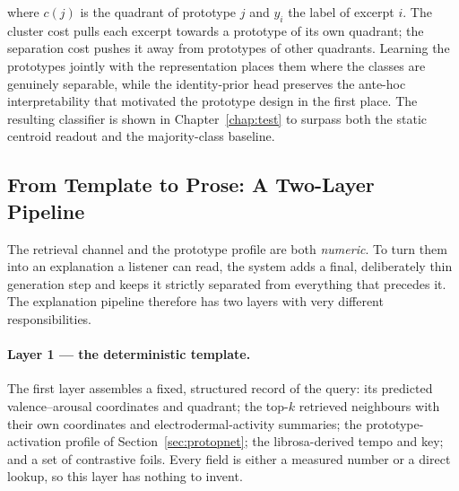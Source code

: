 \documentclass[12pt]{report}
\begin{document}
where $c(j)$ is the quadrant of prototype $j$ and $y_{i}$ the label of excerpt $i$. The cluster cost pulls each excerpt towards a prototype of its own quadrant; the separation cost pushes it away from prototypes of other quadrants. Learning the prototypes jointly with the representation places them where the classes are genuinely separable, while the identity-prior head preserves the ante-hoc interpretability that motivated the prototype design in the first place. The resulting classifier is shown in Chapter~\ref{chap:test} to surpass both the static centroid readout and the majority-class baseline.

\subsection{From Template to Prose: A Two-Layer Pipeline}
\label{sec:rag}

The retrieval channel and the prototype profile are both \emph{numeric}. To turn them into an explanation a listener can read, the system adds a final, deliberately thin generation step and keeps it strictly separated from everything that precedes it. The explanation pipeline therefore has two layers with very different responsibilities.

\paragraph{Layer 1 --- the deterministic template.} The first layer assembles a fixed, structured record of the query: its predicted valence--arousal coordinates and quadrant; the top-$k$ retrieved neighbours with their own coordinates and electrodermal-activity summaries; the prototype-activation profile of Section~\ref{sec:protopnet}; the librosa-derived tempo and key; and a set of contrastive foils. Every field is either a measured number or a direct lookup, so this layer has nothing to invent.
\end{document}

